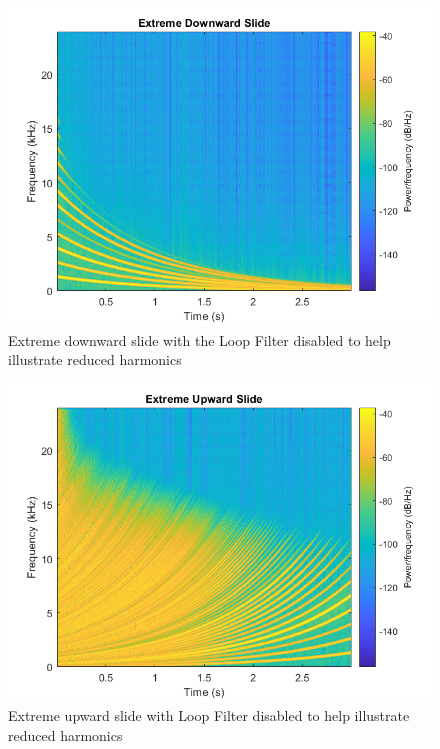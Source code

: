 \documentclass[../main.tex]{subfiles}
\begin{document}
\begin{figure}[h]
    \centering
    \includegraphics[scale=.65]{./images/plots/ExtremeDownwardSlide_NoLoopFilter.png}
    \caption{Extreme downward slide with the Loop Filter disabled to help illustrate reduced harmonics}
    \label{fig:ExtremeDownwardSlide}
\end{figure}

\begin{figure}[h]
    \centering
    \includegraphics[scale=.65]{./images/plots/ExtremeUpwardSlide_NoLoopFilter.png}
    \caption{Extreme upward slide with Loop Filter disabled to help illustrate reduced harmonics}
    \label{fig:ExtremeUpwardSlide}
\end{figure}
\end{document}
